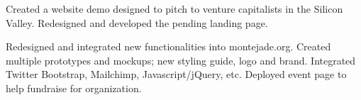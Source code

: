 \documentclass[]{deedy-resume-openfont}
\begin{document}
\begin{minipage}[t]{0.64\textwidth}
\descriptsep 
Created a website demo designed to pitch to venture capitalists in the Silicon Valley. Redesigned and developed the pending landing page.
\sectionsep
\sectionsepextra


\descriptsep 
Redesigned and integrated new functionalities into montejade.org. Created multiple prototypes and mockups; new styling guide, logo and brand. Integrated Twitter Bootstrap, Mailchimp, Javascript/jQuery, etc. Deployed event page to help fundraise for organization.
\sectionsep

\end{minipage} 
\end{document}

